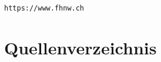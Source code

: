 \documentclass[a4paper,12pt]{article}
\begin{document}
\verb"https://www.fhnw.ch"                   \\

\cleardoublepage


\newpage

\tableofcontents
\newpage
\listoffigures
\listoftables
\newpage
\printnoidxglossary[title=Glossar]
\setcounter{table}{0} %
\newpage











\newpage
\section{Quellenverzeichnis}
\printbibliography



\end{document}
